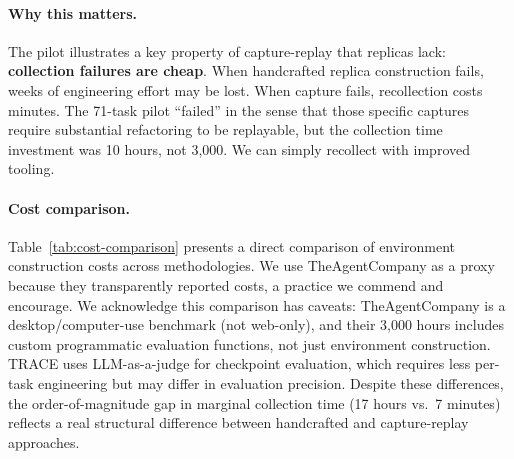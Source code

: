 \documentclass[letterpaper]{article}
\begin{document}
\paragraph{Why this matters.} The pilot illustrates a key property of capture-replay that replicas lack: \textbf{collection failures are cheap}. When handcrafted replica construction fails, weeks of engineering effort may be lost. When capture fails, recollection costs minutes. The 71-task pilot ``failed'' in the sense that those specific captures require substantial refactoring to be replayable, but the collection time investment was 10 hours, not 3,000. We can simply recollect with improved tooling.

\paragraph{Cost comparison.} Table~\ref{tab:cost-comparison} presents a direct comparison of environment construction costs across methodologies. We use TheAgentCompany as a proxy because they transparently reported costs, a practice we commend and encourage. We acknowledge this comparison has caveats: TheAgentCompany is a desktop/computer-use benchmark (not web-only), and their 3,000 hours includes custom programmatic evaluation functions, not just environment construction. TRACE uses LLM-as-a-judge for checkpoint evaluation, which requires less per-task engineering but may differ in evaluation precision. Despite these differences, the order-of-magnitude gap in marginal collection time (17 hours vs.\ 7 minutes) reflects a real structural difference between handcrafted and capture-replay approaches.
\end{document}
